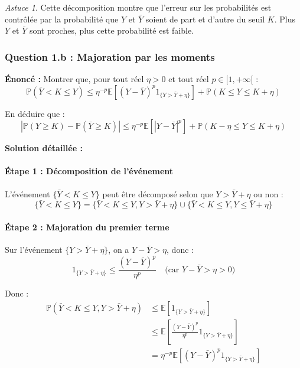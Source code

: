 \documentclass[12pt,a4paper]{article}
\theoremstyle{definition}
\theoremstyle{remark}
\newtheorem*{astuce}{Astuce}
\newcommand{\E}{\mathbb{E}}
\newcommand{\Prob}{\mathbb{P}}
\begin{document}
\begin{astuce}
Cette décomposition montre que l'erreur sur les probabilités est contrôlée par la probabilité que $Y$ et $\bar{Y}$ soient de part et d'autre du seuil $K$. Plus $Y$ et $\bar{Y}$ sont proches, plus cette probabilité est faible.
\end{astuce}

\subsubsection{Question 1.b : Majoration par les moments}

\textbf{Énoncé :} Montrer que, pour tout réel $\eta > 0$ et tout réel $p \in [1, +\infty[$ :
\[
\Prob(\bar{Y} < K \leq Y) \leq \eta^{-p}\E[(Y - \bar{Y})^p 1_{\{Y > \bar{Y} + \eta\}}] + \Prob(K \leq Y \leq K + \eta)
\]

En déduire que :
\[
|\Prob(Y \geq K) - \Prob(\bar{Y} \geq K)| \leq \eta^{-p}\E[|Y - \bar{Y}|^p] + \Prob(K - \eta \leq Y \leq K + \eta)
\]

\textbf{Solution détaillée :}

\paragraph{Étape 1 : Décomposition de l'événement}

L'événement $\{\bar{Y} < K \leq Y\}$ peut être décomposé selon que $Y > \bar{Y} + \eta$ ou non :
\[
\{\bar{Y} < K \leq Y\} = \{\bar{Y} < K \leq Y, Y > \bar{Y} + \eta\} \cup \{\bar{Y} < K \leq Y, Y \leq \bar{Y} + \eta\}
\]

\paragraph{Étape 2 : Majoration du premier terme}

Sur l'événement $\{Y > \bar{Y} + \eta\}$, on a $Y - \bar{Y} > \eta$, donc :
\[
1_{\{Y > \bar{Y} + \eta\}} \leq \frac{(Y - \bar{Y})^p}{\eta^p} \quad \text{(car } Y - \bar{Y} > \eta > 0\text{)}
\]

Donc :
\begin{align*}
\Prob(\bar{Y} < K \leq Y, Y > \bar{Y} + \eta) &\leq \E\left[1_{\{Y > \bar{Y} + \eta\}}\right] \\
&\leq \E\left[\frac{(Y - \bar{Y})^p}{\eta^p}1_{\{Y > \bar{Y} + \eta\}}\right] \\
&= \eta^{-p}\E[(Y - \bar{Y})^p 1_{\{Y > \bar{Y} + \eta\}}]
\end{align*}
\end{document}
